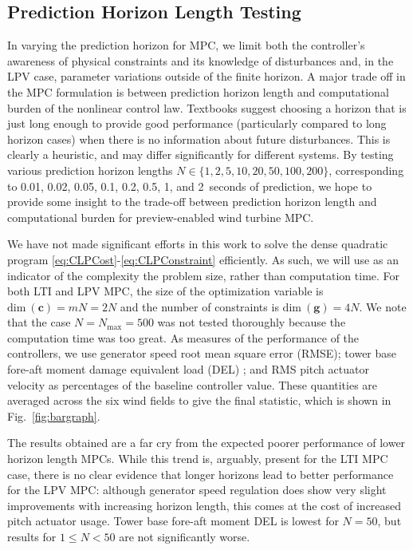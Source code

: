 \documentclass[letterpaper, 10 pt, conference]{ieeeconf}  %
\begin{document}
\subsection{Prediction Horizon Length Testing}
In varying the prediction horizon for MPC, we limit both the controller's awareness of physical constraints and its knowledge of disturbances and, in the LPV case, parameter variations outside of the finite horizon. A major trade off in the MPC formulation is between prediction horizon length and computational burden of the nonlinear control law. Textbooks \cite{Rossiter2018}\cite{Seborg2011} suggest choosing a horizon that is just long enough to provide good performance (particularly compared to long horizon cases) when there is no information about future disturbances. This is clearly a heuristic, and may differ significantly for different systems. By testing various prediction horizon lengths $N \in \{1, 2, 5, 10, 20, 50, 100, 200\}$, corresponding to 0.01, 0.02, 0.05, 0.1, 0.2, 0.5, 1, and 2~seconds of prediction, we hope to provide some insight to the trade-off between prediction horizon length and computational burden for preview-enabled wind turbine MPC.    

We have not made significant efforts in this work to solve the dense quadratic program \eqref{eq:CLPCost}-\eqref{eq:CLPConstraint} efficiently. As such, we will use as an indicator of the complexity the problem size, rather than computation time. For both LTI and LPV MPC, the size of the optimization variable is $\mathrm{dim}\:(\mathbf{c}) = mN = 2N$ and the number of constraints is $\mathrm{dim}\:(\mathbf{g}) = 4N$. We note that the case $N = N_\mathrm{max} = 500$ was not tested thoroughly because the computation time was too great. As measures of the performance of the controllers, we use generator speed root mean square error (RMSE); tower base fore-aft moment damage equivalent load (DEL) \cite{Hayman2012}; and RMS pitch actuator velocity as percentages of the baseline controller value. These quantities are averaged across the six wind fields to give the final statistic, which is shown in Fig.~\ref{fig:bargraph}. 

The results obtained are a far cry from the expected poorer performance of lower horizon length MPCs. While this trend is, arguably, present for the LTI MPC case, there is no clear evidence that longer horizons lead to better performance for the LPV MPC: although generator speed regulation does show very slight improvements with increasing horizon length, this comes at the cost of increased pitch actuator usage. Tower base fore-aft moment DEL is lowest for $N = 50$, but results for $1 \leq N < 50$ are not significantly worse.
\end{document}
